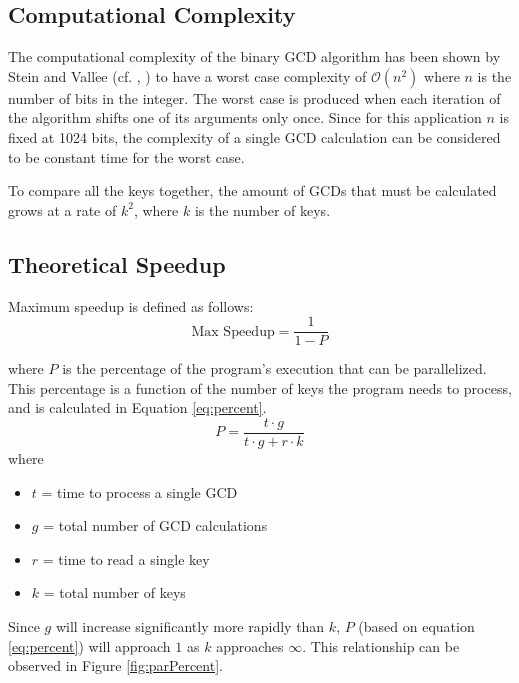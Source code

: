 \documentclass[12pt]{ucthesis}
\begin{document}
\subsection{Computational Complexity}
\label{subsec:compcomp}
The computational complexity of the binary GCD algorithm has been shown by 
Stein and Vall$\acute{\text{e}}$e (cf. \cite{stein1967computational}, 
\cite{vallee1998complete}) to have a worst case complexity of $\mathcal{O}(n^2)$ 
where $n$ is the number of bits in the integer. The worst case is produced 
when each iteration of the algorithm shifts one of its arguments only once. 
Since for this application $n$ is fixed at 1024 bits, the complexity of a 
single GCD calculation can be considered to be constant time for the worst case.

To compare all the keys together, the amount of GCDs that must be calculated 
grows at a rate of $k^2$, where $k$ is the number of keys.

\subsection{Theoretical Speedup}
\label{subsec:theory}
Maximum speedup is defined as follows:
\begin{equation}
   \mbox{Max Speedup} = \frac{1}{1 - P}
   \label{eq:speed}
\end{equation}

where $P$ is the percentage of the program's execution that can be parallelized.
This percentage is a function of the number of keys the program needs to 
process, and is calculated in Equation \ref{eq:percent}.
\begin{equation}
P = \frac{t \cdot g}{t \cdot g + r \cdot k}
   \label{eq:percent}
\end{equation}
where
\begin{itemize}
   \item $t$ = time to process a single GCD
   \item $g$ = total number of GCD calculations
   \item $r$ = time to read a single key
   \item $k$ = total number of keys
\end{itemize}

Since $g$ will increase significantly more rapidly than $k$, $P$ (based on 
equation \ref{eq:percent}) will approach $1$ as $k$ approaches 
$\infty$. This relationship can be observed in Figure \ref{fig:parPercent}.
\end{document}
